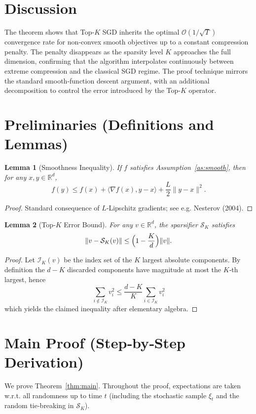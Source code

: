 \documentclass{article}
\newtheorem{lemma}{Lemma}
\newcommand{\R}{\mathbb{R}}
\begin{document}
\section*{Discussion}
The theorem shows that Top‑$K$ SGD inherits the optimal $\mathcal{O}(1/\sqrt{T})$ convergence rate for non‑convex smooth objectives up to a constant compression penalty. The penalty disappears as the sparsity level $K$ approaches the full dimension, confirming that the algorithm interpolates continuously between extreme compression and the classical SGD regime. The proof technique mirrors the standard smooth‑function descent argument, with an additional decomposition to control the error introduced by the Top‑$K$ operator.

\newpage

\section*{Preliminaries (Definitions and Lemmas)}
\begin{lemma}[Smoothness Inequality]\label{lem:smooth}
If $f$ satisfies Assumption~\ref{as:smooth}, then for any $x,y\in\R^{d}$,
\[
f(y)\le f(x)+\langle\nabla f(x),y-x\rangle+\frac{L}{2}\|y-x\|^{2}.
\]
\end{lemma}
\begin{proof}
Standard consequence of $L$‑Lipschitz gradients; see e.g. Nesterov (2004). \qedhere
\end{proof}

\begin{lemma}[Top‑$K$ Error Bound]\label{lem:topk}
For any $v\in\R^{d}$, the sparsifier $\mathcal{S}_{K}$ satisfies
\[
\|v-\mathcal{S}_{K}(v)\|\le\Bigl(1-\frac{K}{d}\Bigr)\|v\|.
\]
\end{lemma}
\begin{proof}
Let $\mathcal{I}_{K}(v)$ be the index set of the $K$ largest absolute components.
By definition the $d-K$ discarded components have magnitude at most the $K$‑th largest, hence
\[
\sum_{i\notin\mathcal{I}_{K}}v_{i}^{2}\le\frac{d-K}{K}\sum_{i\in\mathcal{I}_{K}}v_{i}^{2}
\]
which yields the claimed inequality after elementary algebra. \qedhere
\end{proof}

\section*{Main Proof (Step‑by‑Step Derivation)}
We prove Theorem~\ref{thm:main}. Throughout the proof, expectations are taken w.r.t. all randomness up to time $t$ (including the stochastic sample $\xi_{t}$ and the random tie‑breaking in $\mathcal{S}_{K}$).
\end{document}
